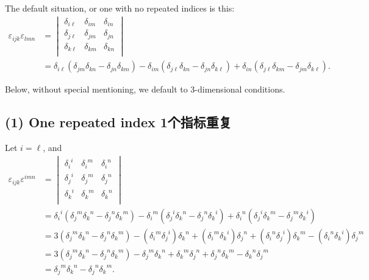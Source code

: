 The default situation, or one with no repeated indices is this:
\begin{align*}
    \varepsilon_{ijk}\varepsilon_{lmn} &= \begin{vmatrix}
        \delta_{i\ell} & \delta_{im} & \delta_{in} \\
        \delta_{j\ell} & \delta_{jm} & \delta_{jn} \\
        \delta_{k\ell} & \delta_{km} & \delta_{kn} \\
    \end{vmatrix} \\
    &= \delta_{i\ell}\left( \delta_{jm}\delta_{kn} - \delta_{jn}\delta_{km}\right) - \delta_{im}\left( \delta_{j\ell}\delta_{kn} - \delta_{jn}\delta_{k\ell} \right) + \delta_{in} \left( \delta_{j\ell}\delta_{km} - \delta_{jm}\delta_{k\ell} \right).
\end{align*}

Below, without special mentioning, we default to 3-dimensional
conditions.

\subsection*{(1) One repeated index
1个指标重复}\label{one-repeated-index-1ux4e2aux6307ux6807ux91cdux590d}

Let \(i=\ell\), and \begin{align*}
    \varepsilon_{ijk}\varepsilon^{imn} &= \begin{vmatrix}
        {\delta_i}^i & {\delta_i}^m & {\delta_i}^n \\
        {\delta_j}^i & {\delta_j}^m & {\delta_j}^n \\
        {\delta_k}^i & {\delta_k}^m & {\delta_k}^n \\
    \end{vmatrix} \\
    &= {\delta_i}^i \left( {\delta_j}^m {\delta_k}^n - {\delta_j}^n {\delta_k}^m \right) - {\delta_i}^m \left( {\delta_j}^i {\delta_k}^n - {\delta_j}^n {\delta_k}^i \right) + {\delta_i}^n \left( {\delta_j}^i {\delta_k}^m - {\delta_j}^m {\delta_k}^i \right) \\
    &= 3\left( {\delta_j}^m {\delta_k}^n - {\delta_j}^n {\delta_k}^m \right) - ({\delta_i}^m {\delta_j}^i) {\delta_k}^n + ({\delta_i}^m {\delta_k}^i) {\delta_j}^n + ({\delta_i}^n {\delta_j}^i) {\delta_k}^m - ({\delta_i}^n {\delta_k}^i) {\delta_j}^m \\
    &= 3\left( {\delta_j}^m {\delta_k}^n - {\delta_j}^n {\delta_k}^m \right) - {\delta_j}^m {\delta_k}^n + {\delta_k}^m {\delta_j}^n + {\delta_j}^n {\delta_k}^m - {\delta_k}^n {\delta_j}^m \\ 
    &= {\delta_j}^m {\delta_k}^n - {\delta_j}^n {\delta_k}^m.
\end{align*}

